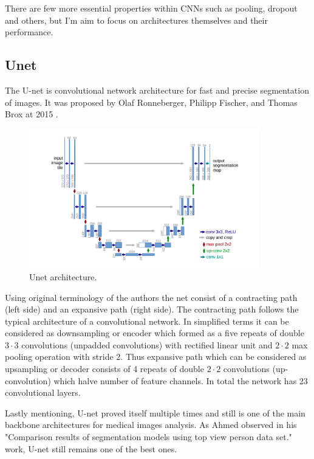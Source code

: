There are few more essential properties within CNNs such as pooling, dropout and others, but I'm aim to focus on architectures themselves and their performance. 

\subsection{Unet}
The U-net is convolutional network architecture for fast and precise segmentation of images. It was proposed by Olaf Ronneberger, Philipp Fischer, and Thomas Brox at 2015 \cite{Ronneberger2015}. 

\begin{figure}[h]
    \centering \includegraphics[width=10cm]{images/unet.png}
    \caption {Unet architecture.}
\end{figure}

Using original terminology of the authors \cite{Ronneberger2015} the net consist of a contracting path (left side) and an expansive path (right side). The contracting path follows the typical architecture of a convolutional network. In simplified terms it can be considered as downsampling or encoder which formed as
a five repeats of double $3 \cdot 3$ convolutions (unpadded convolutions) with rectified linear unit and $2 \cdot 2$ max pooling operation with stride 2. Thus expansive path which can be considered as upsampling or decoder consists of 4 repeats of double $2 \cdot 2$ convolutions (up-convolution) which halve number of feature channels. In total the network has 23 convolutional layers. 

Lastly mentioning, U-net proved itself multiple times and still is one of the main backbone architectures for medical images analysis. As Ahmed \cite{Ahmed2020} observed in his "Comparison results of segmentation models using top view person data set." work, U-net still remains one of the best ones.  

